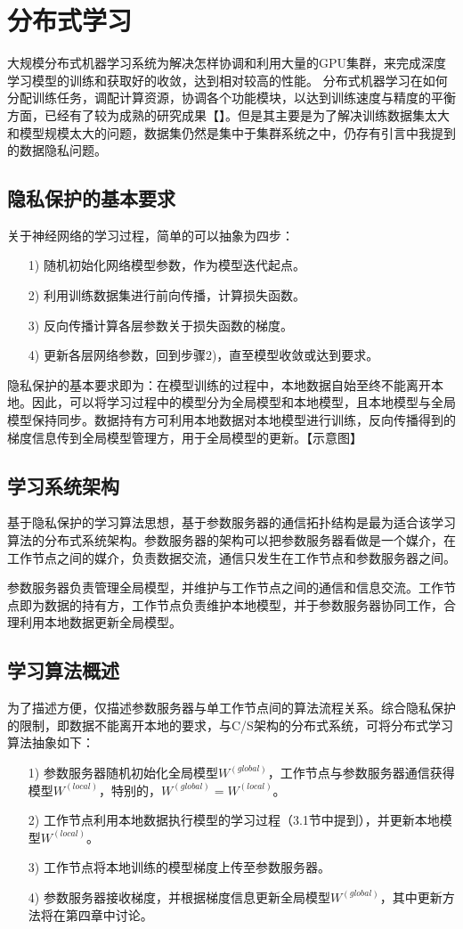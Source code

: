 \documentclass[zihao = -4,cn]{oucart}
\begin{document}
\section{分布式学习}
大规模分布式机器学习系统为解决怎样协调和利用大量的GPU集群，来完成深度学习模型的训练和获取好的收敛，达到相对较高的性能。 分布式机器学习在如何分配训练任务，调配计算资源，协调各个功能模块，以达到训练速度与精度的平衡方面，已经有了较为成熟的研究成果【】。但是其主要是为了解决训练数据集太大和模型规模太大的问题，数据集仍然是集中于集群系统之中，仍存有引言中我提到的数据隐私问题。
\subsection{隐私保护的基本要求}
关于神经网络的学习过程，简单的可以抽象为四步：
\begin{itemize}
	\item [1)]
	随机初始化网络模型参数，作为模型迭代起点。
	\item [2)]
	利用训练数据集进行前向传播，计算损失函数。
	\item [3)]
	反向传播计算各层参数关于损失函数的梯度。
	\item [4)]
	更新各层网络参数，回到步骤2)，直至模型收敛或达到要求。
\end{itemize}
\par
隐私保护的基本要求即为：在模型训练的过程中，本地数据自始至终不能离开本地。因此，可以将学习过程中的模型分为全局模型和本地模型，且本地模型与全局模型保持同步。数据持有方可利用本地数据对本地模型进行训练，反向传播得到的梯度信息传到全局模型管理方，用于全局模型的更新。【示意图】
\subsection{学习系统架构}
基于隐私保护的学习算法思想，基于参数服务器的通信拓扑结构是最为适合该学习算法的分布式系统架构。参数服务器的架构可以把参数服务器看做是一个媒介，在工作节点之间的媒介，负责数据交流，通信只发生在工作节点和参数服务器之间。\par
参数服务器负责管理全局模型，并维护与工作节点之间的通信和信息交流。工作节点即为数据的持有方，工作节点负责维护本地模型，并于参数服务器协同工作，合理利用本地数据更新全局模型。
\subsection{学习算法概述}
为了描述方便，仅描述参数服务器与单工作节点间的算法流程关系。综合隐私保护的限制，即数据不能离开本地的要求，与C/S架构的分布式系统，可将分布式学习算法抽象如下：
\begin{itemize}
	\item [1)]
	参数服务器随机初始化全局模型$W^{(global)}$，工作节点与参数服务器通信获得模型$W^{(local)}$，特别的，$W^{(global)} = W^{(local)}$。
	\item [2)]
	工作节点利用本地数据执行模型的学习过程（3.1节中提到），并更新本地模型$W^{(local)}$。
	\item [3)]
	工作节点将本地训练的模型梯度上传至参数服务器。
	\item [4)]
	参数服务器接收梯度，并根据梯度信息更新全局模型$W^{(global)}$，其中更新方法将在第四章中讨论。
\end{itemize}
\end{document}

